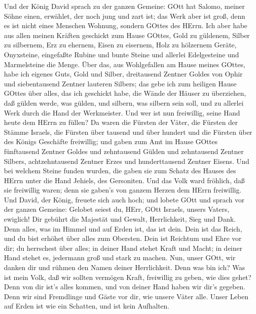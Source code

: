  Und der König David sprach zu der ganzen Gemeine: GOtt hat
Salomo, meiner Söhne einen, erwählet, der noch jung und zart ist; das
Werk aber ist groß, denn es ist nicht eines Menschen Wohnung, sondern
GOttes des HErrn.  Ich aber habe aus allen meinen Kräften
geschickt zum Hause GOttes, Gold zu güldenem, Silber zu silbernem, Erz
zu ehernem, Eisen zu eisernem, Holz zu hölzernem Geräte, Onyxsteine,
eingefaßte Rubine und bunte Steine und allerlei Edelgesteine und
Marmelsteine die Menge.  Über das, aus Wohlgefallen am Hause
meines GOttes, habe ich eigenes Guts, Gold und Silber, 
dreitausend Zentner Goldes von Ophir und siebentausend Zentner lauteren
Silbers; das gebe ich zum heiligen Hause GOttes über alles, das ich
geschickt habe, die Wände der Häuser zu überziehen,  daß
gülden werde, was gülden, und silbern, was silbern sein soll, und zu
allerlei Werk durch die Hand der Werkmeister. Und wer ist nun
freiwillig, seine Hand heute dem HErrn zu füllen?  Da waren
die Fürsten der Väter, die Fürsten der Stämme Israels, die Fürsten über
tausend und über hundert und die Fürsten über des Königs Geschäfte
freiwillig;  und gaben zum Amt im Hause GOttes fünftausend
Zentner Goldes und zehntausend Gülden und zehntausend Zentner Silbers,
achtzehntausend Zentner Erzes und hunderttausend Zentner Eisens.
 Und bei welchem Steine funden wurden, die gaben sie zum
Schatz des Hauses des HErrn unter die Hand Jehiels, des Gersoniten.
 Und das Volk ward fröhlich, daß sie freiwillig waren; denn
sie gaben's von ganzem Herzen dem HErrn freiwillig. Und David, der
König, freuete sich auch hoch;  und lobete GOtt und sprach
vor der ganzen Gemeine: Gelobet seiest du, HErr, GOtt Israels, unsers
Vaters, ewiglich!  Dir gebührt die Majestät und Gewalt,
Herrlichkeit, Sieg und Dank. Denn alles, was im Himmel und auf Erden
ist, das ist dein. Dein ist das Reich, und du bist erhöhet über alles
zum Obersten.  Dein ist Reichtum und Ehre vor dir; du
herrschest über alles; in deiner Hand stehet Kraft und Macht; in deiner
Hand stehet es, jedermann groß und stark zu machen.  Nun,
unser GOtt, wir danken dir und rühmen den Namen deiner Herrlichkeit.
 Denn was bin ich? Was ist mein Volk, daß wir sollten
vermögen Kraft, freiwillig zu geben, wie dies gehet? Denn von dir ist's
alles kommen, und von deiner Hand haben wir dir's gegeben. 
Denn wir sind Fremdlinge und Gäste vor dir, wie unsere Väter alle. Unser
Leben auf Erden ist wie ein Schatten, und ist kein Aufhalten.

